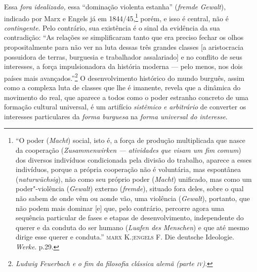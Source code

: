 Essa \emph{fora idealizado,} essa ``dominação violenta estanha''
(\emph{fremde Gewalt}), indicado por Marx e Engels já em 1844/45,\footnote{``O poder (\emph{Macht}) social, isto é, a força de produção
  multiplicada que nasce da cooperação (\emph{Zusammenwirken ---
  atividades que visam um fim comum}) dos diversos indivíduos
  condicionada pela divisão do trabalho, aparece a esses indivíduos,
  porque a própria cooperação não é voluntária, mas espontânea
  (\emph{naturwüchsig}), não como seu próprio poder (\emph{Macht})
  unificado, mas como um poder"-violência (\emph{Gewalt}) externo
  (\emph{fremde}), situado fora deles, sobre o qual não sabem de onde
  vêm ou aonde vão, uma violência (\emph{Gewalt}), portanto, que não
  podem mais dominar {[}e{]} que, pelo contrário, percorre agora uma
  sequência particular de fases e etapas de desenvolvimento,
  independente do querer e da conduta do ser humano (\emph{Luafen des
  Menschen}) e que até mesmo dirige esse querer e conduta.''
  \textsc{marx} K.;\textsc{engels} F. Die deutsche Ideologie.
  \emph{Werke}. p.29.} porém, e isso é central, não é
\emph{contingente}. Pelo contrário, sua existência é o sinal da
evidência da sua contradição: ``As relações se simplificaram tanto que
era preciso fechar os olhos propositalmente para não ver na luta dessas
três grandes classes {[}a aristocracia possuidora de terras, burguesia e
trabalhador assalariado{]} e no conflito de seus interesses, a força
impulsionadora da história moderna --- pelo menos, nos dois países mais
avançados.''\footnote{\emph{Ludwig Feuerbach e o fim da filosofia
  clássica alemã (parte \textsc{iv})}.} O desenvolvimento histórico do
mundo burguês, assim como a complexa luta de classes que lhe é imanente,
revela que a dinâmica do movimento do real, que aparece a todos como o
poder estranho concreto de uma formação cultural universal, é um
artifício \emph{sistêmico e arbitrário} de converter os interesses
particulares da \emph{forma burguesa} na \emph{forma universal do
interesse}.

